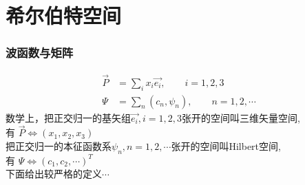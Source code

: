 \section{希尔伯特空间}

\begin{frame} [allowframebreaks=]
    \frametitle{波函数与矩阵}
    \begin{equation*}
        \begin{split}
            \vec{P}&=\sum_i{x_i\vec{e_i}}, \qquad i=1,2,3 \\
            \Psi&=\sum_n (c_n, \psi_n), \qquad n=1,2,\cdots 
        \end{split}  
    \end{equation*}
    数学上，把正交归一的基矢组{$\vec{e_i}, i=1,2,3$}张开的空间叫三维矢量空间, \\
    有 $\vec{P}\Leftrightarrow(x_1,x_2,x_3)$\\
    把正交归一的本征函数系{$\psi_n, n=1,2,\cdots$}张开的空间叫Hilbert空间,\\
    有 $\Psi\Leftrightarrow(c_1,c_2,\cdots)^T$\\
    下面给出较严格的定义$\cdots$
\end{frame} 

